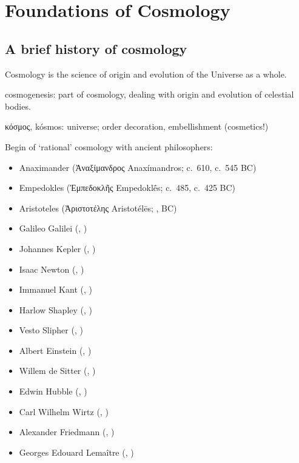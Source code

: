 \section{Foundations of Cosmology}
\label{sec:found-cosmo}

\subsection{A brief history of cosmology}

Cosmology is the science of origin and evolution of the Universe as a whole.

cosmogenesis: part of cosmology, dealing with origin and evolution of celestial 
bodies.

κόσμος, kósmos: universe; order decoration, embellishment (cosmetics!)

Begin of `rational' cosmology with ancient philosophers:

\begin{itemize}
\item Anaximander (Ἀναξίμανδρος Anaxímandros; \textborn c.\ 610, \textdied c.\ 
545 BC)
\item Empedokles (Ἐμπεδοκλῆς Empedoklḗs; \textborn c.\ 485, \textdied c.\ 425 
BC)
\item Aristoteles (Ἀριστοτέλης Aristotélēs; , 
 BC)
\item Galileo Galilei (, )
\item Johannes Kepler (, )
\item Isaac Newton (, )
\item Immanuel Kant (, )
\item Harlow Shapley (, )
\item Vesto Slipher (, )
\item Albert Einstein (, )
\item Willem de Sitter (, )
\item Edwin Hubble (, )
\item Carl Wilhelm Wirtz (, )
\item Alexander Friedmann (, )
\item Georges Edouard Lemaître (, )
\end{itemize}

